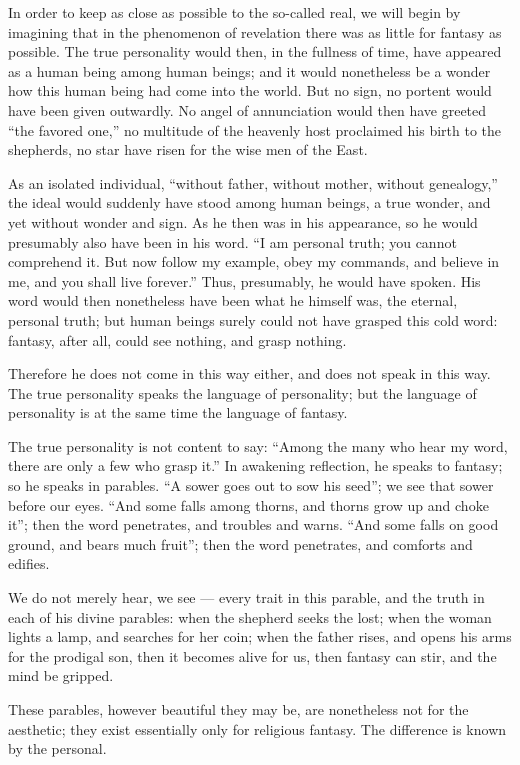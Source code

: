 \documentclass[12pt,a4paper]{book}
\begin{document}
In order to keep as close as possible to the so-called real, we will begin by imagining that in the phenomenon of revelation there was as little for fantasy as possible.
The true personality would then, in the fullness of time, have appeared as a human being among human beings; and it would nonetheless be a wonder how this human being had come into the world. But no sign, no portent would have been given outwardly. No angel of annunciation would then have greeted ``the favored one,'' no multitude of the heavenly host proclaimed his birth to the shepherds, no star have risen for the wise men of the East.

As an isolated individual, ``without father, without mother, without genealogy,'' the ideal would suddenly have stood among human beings, a true wonder, and yet without wonder and sign. As he then was in his appearance, so he would presumably also have been in his word. ``I am personal truth; you cannot comprehend it. But now follow my example, obey my commands, and believe in me, and you shall live forever.'' Thus, presumably, he would have spoken. His word would then nonetheless have been what he himself was, the eternal, personal truth; but human beings surely could not have grasped this cold word: fantasy, after all, could see nothing, and grasp nothing.

Therefore he does not come in this way either, and does not speak in this way. The true personality speaks the language of personality; but the language of personality is at the same time the language of fantasy.

The true personality is not content to say: ``Among the many who hear my word, there are only a few who grasp it.'' In awakening reflection, he speaks to fantasy; so he speaks in parables. ``A sower goes out to sow his seed''; we see that sower before our eyes. ``And some falls among thorns, and thorns grow up and choke it''; then the word penetrates, and troubles and warns. ``And some falls on good ground, and bears much fruit''; then the word penetrates, and comforts and edifies.

We do not merely hear, we see --- every trait in this parable, and the truth in each of his divine parables: when the shepherd seeks the lost; when the woman lights a lamp, and searches for her coin; when the father rises, and opens his
arms for the prodigal son, then it becomes alive for us, then fantasy can stir, and the mind be gripped.

These parables, however beautiful they may be, are nonetheless not for the aesthetic; they exist essentially only for religious fantasy. The difference is known by the personal.
\end{document}
